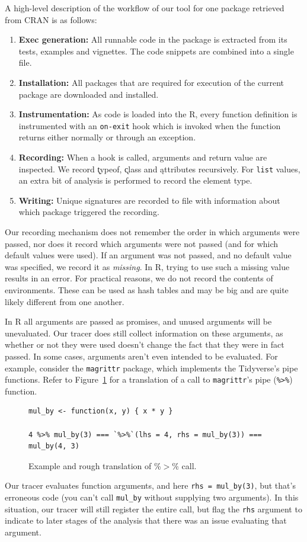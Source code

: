 \documentclass[acmsmall,10pt,review,anonymous]{acmart}\settopmatter{printfolios=true,printccs=false,printacmref=false}
\newcommand{\code}[1]{\lstinline|#1|\xspace}
\begin{document}
A high-level description of the workflow of our tool for one package
retrieved from CRAN is as follows:

\begin{enumerate}
\item {\bf Exec generation:} All runnable code in the package is extracted
  from its tests, examples and vignettes. The code snippets are combined
  into a single file.
\item {\bf Installation:} All packages that are required for execution of
  the current package are downloaded and installed.
\item {\bf Instrumentation:} As code is loaded into the R, every function
  definition is instrumented with an \code{on-exit} hook which is invoked
  when the function returns either normally or through an exception.
\item {\bf Recording:} When a hook is called, arguments and return value are
  inspected. We record \k{typeof}, \k{class} and \k{attributes} recursively.
  For \code{list} values, an extra bit of analysis is performed to record
  the element type.
\item {\bf Writing:} Unique signatures are recorded to file with information
  about which package triggered the recording.
\end{enumerate}

Our recording mechanism does not remember the order in which arguments were
passed, nor does it record which arguments were not passed (and for which
default values were used). If an argument was not passed, and no default
value was specified, we record it as \emph{missing}. In R, trying to use
such a missing value results in an error. For practical reasons, we do not
record the contents of environments. These can be used as hash tables and
may be big and are quite likely different from one another.

In R all arguments are passed as promises, and unused arguments will be unevaluated.
Our tracer does still collect information on these arguments, as whether or not they were used doesn't change the fact that they were in fact passed. 
In some cases, arguments aren't even intended to be evaluated.
For example, consider the {\tt magrittr} package, which implements the Tidyverse's pipe functions.
Refer to Figure~\ref{fig:magpipeex} for a translation of a call to {\tt magrittr}'s pipe ({\tt \%>\%}) function.
\begin{figure}[!hb]{\small\begin{lstlisting}[style=R]
mul_by <- function(x, y) { x * y }

4 %>% mul_by(3) === `%>%`(lhs = 4, rhs = mul_by(3)) === mul_by(4, 3)
\end{lstlisting}}\caption{Example and rough translation of \%$>$\% call.}\label{fig:magpipeex}\end{figure}
Our tracer evaluates function arguments, and here \code{rhs = mul_by(3)}, but that's erroneous code (you can't call {\tt mul\_by} without supplying two arguments).
In this situation, our tracer will still register the entire call, but flag the {\tt rhs} argument to indicate to later stages of the analysis that there was an issue evaluating that argument.
\end{document}
